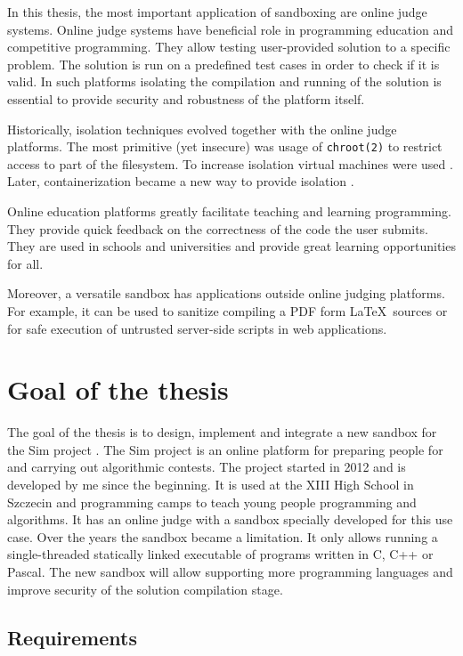 \documentclass[en]{pracamgr}
\begin{document}
In this thesis, the most important application of sandboxing are online judge systems. Online judge systems have beneficial role in programming education and competitive programming. They allow testing user-provided solution to a specific problem. The solution is run on a predefined test cases in order to check if it is valid. In such platforms isolating the compilation and running of the solution is essential to provide security and robustness of the platform itself.

Historically, isolation techniques evolved together with the online judge platforms. The most primitive (yet insecure) was usage of \texttt{chroot(2)} \cite{prevelakis2001sandboxing} to restrict access to part of the filesystem. To increase isolation virtual machines were used \cite{5635141}. Later, containerization became a new way to provide isolation \cite{marevs2012new, SPACEK20151665}.

Online education platforms greatly facilitate teaching and learning programming. They provide quick feedback on the correctness of the code the user submits. They are used in schools and universities and provide great learning opportunities for all.

Moreover, a versatile sandbox has applications outside online judging platforms. For example, it can be used to sanitize compiling a PDF form \LaTeX~sources or for safe execution of untrusted server-side scripts in web applications.

\section{Goal of the thesis}

The goal of the thesis is to design, implement and integrate a new sandbox for the Sim project \cite{sim_project}. The Sim project is an online platform for preparing people for and carrying out algorithmic contests. The project started in 2012 and is developed by me since the beginning. It is used at the XIII High School in Szczecin and programming camps to teach young people programming and algorithms. It has an online judge with a sandbox specially developed for this use case. Over the years the sandbox became a limitation. It only allows running a single-threaded statically linked executable of programs written in C, C++ or Pascal. The new sandbox will allow supporting more programming languages and improve security of the solution compilation stage.

\subsection{Requirements}
\end{document}
